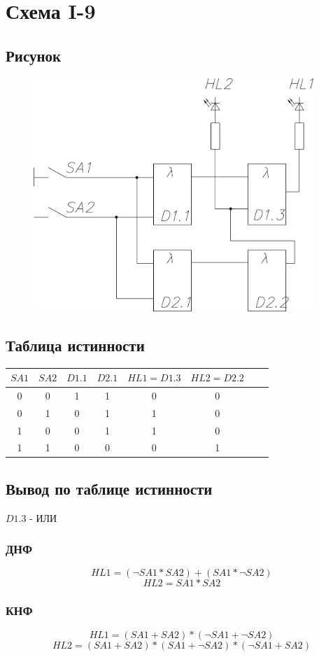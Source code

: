 \documentclass[a4paper]{article}
\begin{document}
\section{Схема I-9}
\subsection{Рисунок}
\begin{figure}[H]
    \centering
    \includegraphics[width=300pt]{9.png}
\end{figure}
\subsection{Таблица истинности}
\begin{table}[H]
    \centering
    \begin{tabular}{|c|c|c|c|c|c|c|c|}
        \hline
        $SA1$ & $SA2$ & $D1.1$ & $D2.1$ & $HL1 = D1.3$ & $HL2 = D2.2$\\
        \hline
        0 & 0 & 1 & 1 & 0 & 0 \\
        0 & 1 & 0 & 1 & 1 & 0 \\
        1 & 0 & 0 & 1 & 1 & 0 \\
        1 & 1 & 0 & 0 & 0 & 1 \\
        \hline
    \end{tabular}
\end{table}

\subsection{Вывод по таблице истинности}
$D1.3$ - ИЛИ
\subsubsection{ДНФ}
$$ HL1 = (\neg SA1 * SA2) + (SA1 * \neg SA2)$$ 
$$ HL2 = SA1*SA2 $$ 
\subsubsection{КНФ}
$$ HL1 = (SA1 + SA2) * (\neg SA1 + \neg SA2 ) $$
$$ HL2 =  (SA1 + SA2) * (SA1 + \neg SA2) * (\neg SA1 + SA2) $$
\end{document}
